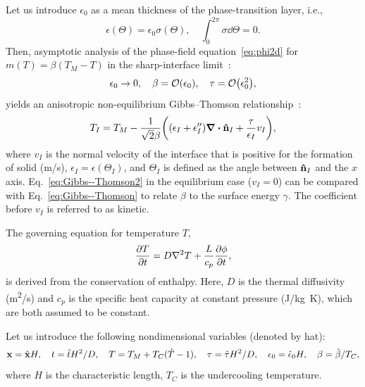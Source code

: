 \documentclass{article}
\begin{document}
Let us introduce $\epsilon_0$ as a mean thickness of the phase-transition layer, i.e.,
\begin{equation}\label{eq:epsilon}
    \epsilon(\Theta) = \epsilon_0\sigma(\Theta), \quad
    \int_0^{2\pi}\sigma\dd\Theta = 0.
\end{equation}
Then, asymptotic analysis of the phase-field equation~\eqref{eq:phi2d} for $m(T) = \beta(T_M-T)$
in the sharp-interface limit~\cite{caginalp1986analysis}:
\begin{equation}\label{eq:sil}
    \epsilon_0\to0, \quad \beta=\order{\epsilon_0}, \quad \tau=\order{\epsilon_0^2},
\end{equation}
yields an anisotropic non-equilibrium Gibbs--Thomson relationship~\cite{mcfadden1993phase}:
\begin{equation}\label{eq:Gibbs--Thomson2}
    T_I = T_M - \frac{1}{\sqrt2\beta} \qty(
        \qty(\epsilon_I + \epsilon_I'')\div\vu{n}_I
        + \frac{\tau}{\epsilon_I} v_I ),
\end{equation}
where $v_I$ is the normal velocity of the interface that is positive for the formation of solid (\si{m/s}),
$\epsilon_I=\epsilon(\Theta_I)$, and $\Theta_I$ is defined as the angle between $\vu{n}_I$ and the $x$ axis.
Eq.~\eqref{eq:Gibbs--Thomson2} in the equilibrium case ($v_I=0$) can be compared with Eq.~\eqref{eq:Gibbs--Thomson}
to relate $\beta$ to the surface energy $\gamma$. The coefficient before $v_I$ is referred to as kinetic.

The governing equation for temperature $T$,
\begin{equation}\label{eq:temperature}
    \pdv{T}{t} = D\laplacian{T} + \frac{L}{c_p}\pdv{\phi}{t},
\end{equation}
is derived from the conservation of enthalpy.
Here, $D$ is the thermal diffusivity (\si{m^2/s}) and
$c_p$ is the specific heat capacity at constant pressure (\si{J/kg.K}),
which are both assumed to be constant.

Let us introduce the following nondimensional variables (denoted by hat):
\begin{equation}\label{eq:dimensionless}
    \vb{x} = \hat{\vb{x}}H, \quad t = \hat{t}H^2/D, \quad
    T = T_M + T_C(\hat{T}-1), \quad \tau = \hat{\tau}H^2/D, \quad
    \epsilon_0 = \hat{\epsilon}_0H, \quad \beta = \hat{\beta}/T_C,
\end{equation}
where $H$ is the characteristic length, $T_C$ is the undercooling temperature.
\end{document}
